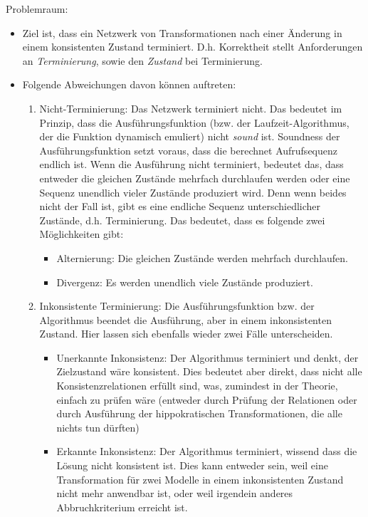 Problemraum:
\begin{itemize}
    \item Ziel ist, dass ein Netzwerk von Transformationen nach einer Änderung in einem konsistenten Zustand terminiert. D.h. Korrektheit stellt Anforderungen an \emph{Terminierung}, sowie den \emph{Zustand} bei Terminierung.
    \item Folgende Abweichungen davon können auftreten:
    \begin{enumerate}
        \item Nicht-Terminierung: Das Netzwerk terminiert nicht. Das bedeutet im Prinzip, dass die Ausführungsfunktion (bzw. der Laufzeit-Algorithmus, der die Funktion dynamisch emuliert) nicht \emph{sound} ist. Soundness der Ausführungsfunktion setzt voraus, dass die berechnet Aufrufsequenz endlich ist. Wenn die Ausführung nicht terminiert, bedeutet das, dass entweder die gleichen Zustände mehrfach durchlaufen werden oder eine Sequenz unendlich vieler Zustände produziert wird. Denn wenn beides nicht der Fall ist, gibt es eine endliche Sequenz unterschiedlicher Zustände, d.h. Terminierung. Das bedeutet, dass es folgende zwei Möglichkeiten gibt:
        \begin{itemize}
            \item Alternierung: Die gleichen Zustände werden mehrfach durchlaufen.
            \item Divergenz: Es werden unendlich viele Zustände produziert.
        \end{itemize}
        \item Inkonsistente Terminierung: Die Ausführungsfunktion bzw. der Algorithmus beendet die Ausführung, aber in einem inkonsistenten Zustand. Hier lassen sich ebenfalls wieder zwei Fälle unterscheiden.
        \begin{itemize}
            \item Unerkannte Inkonsistenz: Der Algorithmus terminiert und denkt, der Zielzustand wäre konsistent. Dies bedeutet aber direkt, dass nicht alle Konsistenzrelationen erfüllt sind, was, zumindest in der Theorie, einfach zu prüfen wäre (entweder durch Prüfung der Relationen oder durch Ausführung der hippokratischen Transformationen, die alle nichts tun dürften)
            \item Erkannte Inkonsistenz: Der Algorithmus terminiert, wissend dass die Lösung nicht konsistent ist. Dies kann entweder sein, weil eine Transformation für zwei Modelle in einem inkonsistenten Zustand nicht mehr anwendbar ist, oder weil irgendein anderes Abbruchkriterium erreicht ist.
        \end{itemize}
    \end{enumerate}
\end{itemize}

